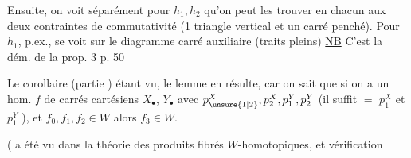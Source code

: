 Ensuite, on voit séparément pour $h_1,h_2$ qu'on peut les trouver en  chacun aux deux contraintes de commutativité (1 triangle vertical et un carré penché). Pour $h_1$, p.ex.,  se voit sur le diagramme carré auxiliaire (traits pleins)
\uline{NB} C'est la dém. de la prop. 3 p. 50

Le corollaire (partie ) étant vu, le  lemme en résulte, car on sait que si on a un hom. $f$ de carrés cartésiens $X_\bullet$, $Y_\bullet$
avec $p_{\unsure{1|2}}^X,p_2^X,p_1^Y,p_2^Y$  (il suffit $=$ $p_1^X$ et $p_1^Y$ ), et $f_0,f_1,f_2\in W$ alors $f_3\in W$.

( a été vu dans la théorie des produits fibrés $W$-homotopiques, et  vérification
